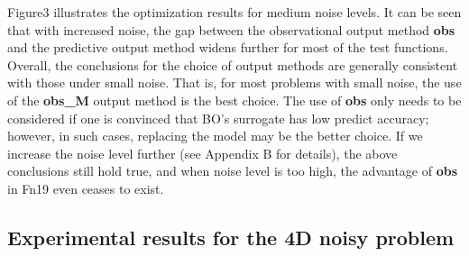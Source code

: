 \documentclass{article}
\begin{document}
\hspace{2em}Figure3 illustrates the optimization results for medium noise levels. It can be seen that with increased noise, the gap between the observational output method \textbf{obs} and the predictive output method widens further for most of the test functions. Overall, the conclusions for the choice of output methods are generally consistent with those under small noise. That is, for most problems with small noise, the use of the \textbf{obs\_M} output method is the best choice. The use of \textbf{obs} only needs to be considered if one is convinced that BO's surrogate has low predict accuracy; however, in such cases, replacing the model may be the better choice. If we increase the noise level further (see Appendix B for details), the above conclusions still hold true, and when noise level is too high, the advantage of \textbf{obs} in Fn19 even ceases to exist.

\subsection{Experimental results for the 4D noisy problem}
\end{document}
